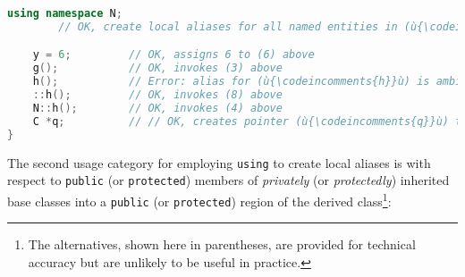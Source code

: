 \begin{lstlisting}[language=C++]
    using namespace N;
        // OK, create local aliases for all named entities in (ù{\codeincomments{namespace}}ù) (ù{\codeincomments{N}}ù).

    y = 6;         // OK, assigns 6 to (6) above
    g();           // OK, invokes (3) above
    h();           // Error: alias for (ù{\codeincomments{h}}ù) is ambiguous; (4) or (8) above.
    ::h();         // OK, invokes (8) above
    N::h();        // OK, invokes (4) above
    C *q;          // // OK, creates pointer (ù{\codeincomments{q}}ù) to incomplete type (ù{\codeincomments{C}}ù) (8) above
}
\end{lstlisting}
    
\noindent The second usage category for employing \texttt{using} to create local
aliases is with respect to \texttt{public} (or \texttt{protected})
members of \emph{privately} (or \emph{protectedly}) inherited base
classes into a \texttt{public} (or \texttt{protected}) region of the
derived class{\cprotect\footnote{The alternatives, shown here in
parentheses, are provided for technical accuracy but are unlikely to
  be useful in practice.}}:

